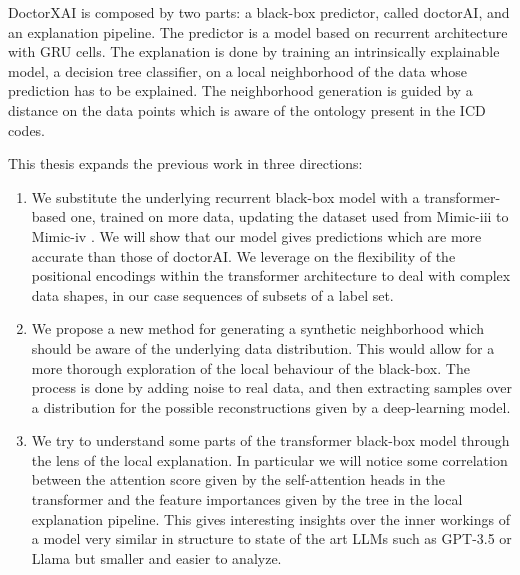 \documentclass[]{marticle}
\begin{document}
DoctorXAI is composed by two parts: a black-box predictor, called doctorAI, and an explanation
pipeline. The predictor is a model based on recurrent architecture with GRU cells. The explanation
is done by training an intrinsically explainable model, a decision tree classifier, on a local
neighborhood of the data whose prediction has to be explained. The neighborhood generation is guided
by a distance on the data points which is aware of the ontology present in the ICD codes.

This thesis expands the previous work in three directions:
\begin{enumerate}

\item We substitute the underlying recurrent black-box model with a transformer-based one, trained
on more data, updating the dataset used from Mimic-iii to Mimic-iv . We will show that our model
gives predictions which are more accurate than those of doctorAI. We leverage on the flexibility of
the positional encodings within the transformer architecture to deal with complex data shapes, in
our case sequences of subsets of a label set.

\item We propose a new method for generating a synthetic neighborhood which should be aware of the
underlying data distribution. This would allow for a more thorough exploration of the local behaviour
of the black-box. The process is done by adding noise to real data, and then extracting
samples over a distribution for the possible reconstructions given by a deep-learning model.

\item We try to understand some parts of the transformer black-box model through the lens of the
local explanation. In particular we will notice some correlation between the attention score given
by the self-attention heads in the transformer and the feature importances given by the tree in the
local explanation pipeline. This gives interesting insights over the inner workings of a model very
similar in structure to state of the art LLMs such as GPT-3.5 or Llama but smaller and easier to
analyze.

\end{enumerate}
\end{document}
